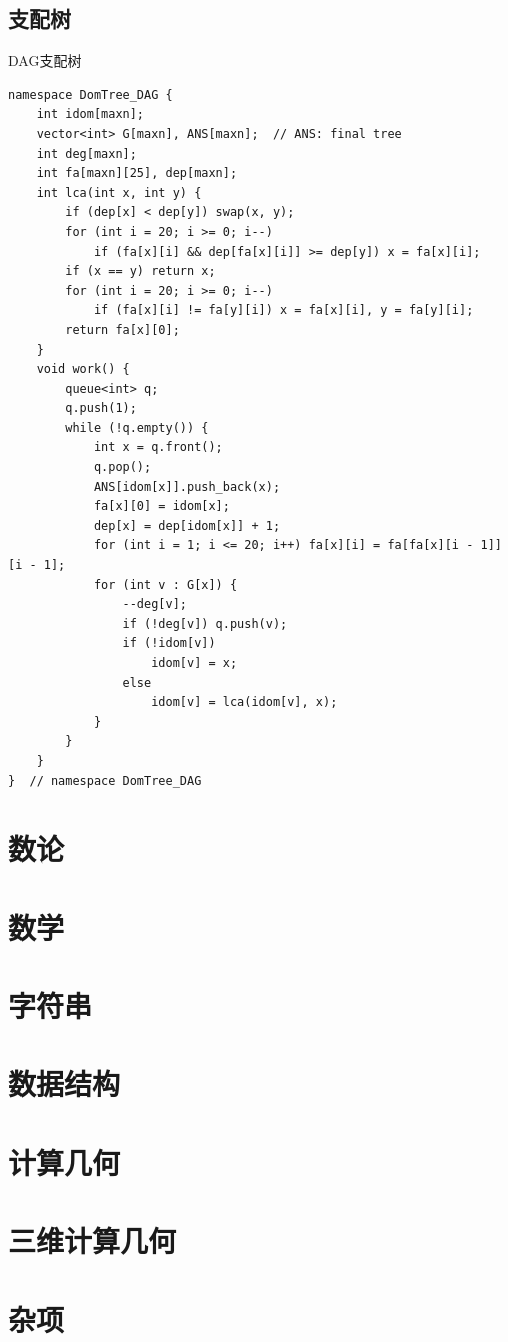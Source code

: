 \documentclass[twoside]{article}
\begin{document}
\subsection{支配树}
DAG支配树
\begin{lstlisting}
namespace DomTree_DAG {
    int idom[maxn];
    vector<int> G[maxn], ANS[maxn];  // ANS: final tree
    int deg[maxn];
    int fa[maxn][25], dep[maxn];
    int lca(int x, int y) {
        if (dep[x] < dep[y]) swap(x, y);
        for (int i = 20; i >= 0; i--)
            if (fa[x][i] && dep[fa[x][i]] >= dep[y]) x = fa[x][i];
        if (x == y) return x;
        for (int i = 20; i >= 0; i--)
            if (fa[x][i] != fa[y][i]) x = fa[x][i], y = fa[y][i];
        return fa[x][0];
    }
    void work() {
        queue<int> q;
        q.push(1);
        while (!q.empty()) {
            int x = q.front();
            q.pop();
            ANS[idom[x]].push_back(x);
            fa[x][0] = idom[x];
            dep[x] = dep[idom[x]] + 1;
            for (int i = 1; i <= 20; i++) fa[x][i] = fa[fa[x][i - 1]][i - 1];
            for (int v : G[x]) {
                --deg[v];
                if (!deg[v]) q.push(v);
                if (!idom[v])
                    idom[v] = x;
                else
                    idom[v] = lca(idom[v], x);
            }
        }
    }
}  // namespace DomTree_DAG
\end{lstlisting}
\clearpage\section{数论}
\clearpage\section{数学}
\clearpage\section{字符串}
\clearpage\section{数据结构}
\clearpage\section{计算几何}
\clearpage\section{三维计算几何}
\clearpage\section{杂项}
\end{document}
